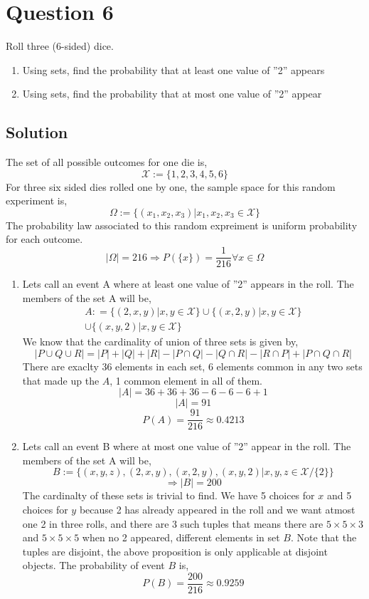 \documentclass[a4paper, 11pt]{article}
\begin{document}
\section*{Question 6}
Roll three (6-sided) dice.
\begin{enumerate}[label=(\alph*)]
    \item Using sets, find the probability that at least one value of ''2'' appears
    \item Using sets, find the probability that at most one value of ''2'' appear
\end{enumerate}
\subsection*{Solution}
The set of all possible outcomes for one die is,
\[\mathcal{X} :=\{1,2,3,4,5,6\}\]
For three six sided dies rolled one by one, the sample space for this random experiment is,
\[\Omega := \{(x_1,x_2,x_3)|x_1,x_2,x_3\in\mathcal{X}\}\]
The probability law associated to this random expreiment is uniform probability for each outcome.
\[|\Omega|=216\Rightarrow P(\{x\})=\frac{1}{216}\forall x\in\Omega\]
\begin{enumerate}[label=(\alph*)]
    \item Lets call an event A where at least one value of ''2'' appears in the roll. The members of the set A will be,
          \begin{multline*}
              A: =\{(2,x,y)|x,y\in\mathcal{X}\}\cup \{(x,2,y)|x,y\in\mathcal{X}\}\\\cup \{(x,y,2)|x,y\in\mathcal{X}\}
          \end{multline*}
          We know that the cardinality of union of three sets is given by,
          \[|P\cup Q\cup R|=|P|+|Q|+|R|-|P\cap Q|-|Q\cap R|-|R\cap P|+|P\cap Q\cap R|\]
          There are exaclty 36 elements in each set, 6 elements common in any two sets that made up the $A$, 1 common element in all of them.
          \[|A|=36+36+36-6-6-6+1\]
          \[|A|=91\]
          \[P(A)=\frac{91}{216}\approx 0.4213\]

    \item Lets call an event B where at most one value of ''2'' appear in the roll. The members of the set A will be,
          \[B :=\{(x,y,z),(2,x,y),(x,2,y),(x,y,2)|x,y,z\in\mathcal{X}/\{2\}\}\]
          \[\Rightarrow |B|=200\]
          The cardinalty of these sets is trivial to find. We have 5 choices for $x$ and 5 choices for $y$ because 2 has already
          appeared in the roll and we want atmost one 2 in three rolls, and there are 3 such tuples that means there are
          $5 \times 5 \times 3$ and $5\times 5\times 5$ when no 2 appeared, different elements in set $B$. Note that the tuples
          are disjoint, the above proposition is only applicable at disjoint objects. The probability of event $B$ is,
          \[P(B)=\frac{200}{216}\approx 0.9259\]
\end{enumerate}
\end{document}

